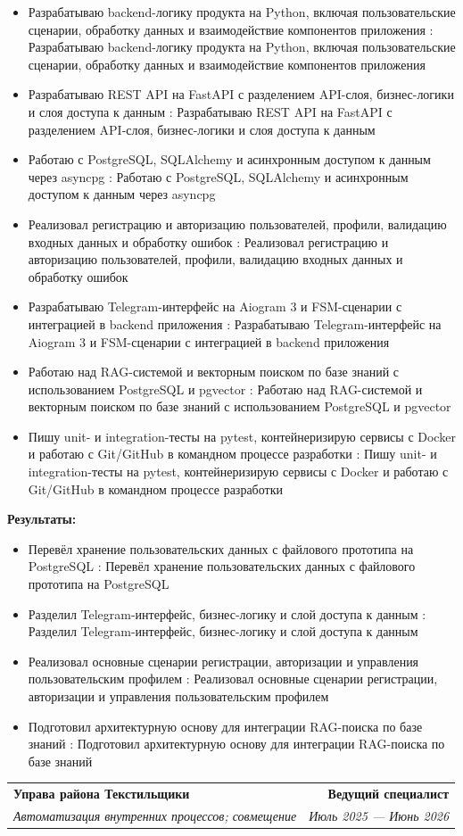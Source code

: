 \documentclass[a4paper,11pt]{article}
\makeatletter
\newcommand{\resumeItem}[2]{
  \item\small{
    \if\relax\detokenize{#1}\relax
      #2
    \else
      \textbf{#1}: #2
    \fi
    \vspace{-2pt}
  }
}
\newcommand{\resumeSubheading}[4]{
  \vspace{-1pt}\item
  \begin{tabular*}{0.97\textwidth}
    {l@{\extracolsep{\fill}}r}
    \textbf{#1} & #2 \\
    \textit{\small #3} & \textit{\small #4} \\
  \end{tabular*}
  \vspace{-5pt}
}
\newcommand{\resumeItemListStart}{
  \begin{itemize}[leftmargin=18pt]
}
\newcommand{\resumeItemListEnd}{
  \end{itemize}\vspace{-5pt}
}
\makeatother
\begin{document}
\vspace{3pt}

\resumeItemListStart

\resumeItem{}
{Разрабатываю backend-логику продукта на Python,
включая пользовательские сценарии, обработку данных
и взаимодействие компонентов приложения}

\resumeItem{}
{Разрабатываю REST API на FastAPI с разделением
API-слоя, бизнес-логики и слоя доступа к данным}

\resumeItem{}
{Работаю с PostgreSQL, SQLAlchemy и асинхронным
доступом к данным через asyncpg}

\resumeItem{}
{Реализовал регистрацию и авторизацию пользователей,
профили, валидацию входных данных и обработку ошибок}

\resumeItem{}
{Разрабатываю Telegram-интерфейс на Aiogram 3
и FSM-сценарии с интеграцией в backend приложения}

\resumeItem{}
{Работаю над RAG-системой и векторным поиском
по базе знаний с использованием PostgreSQL и pgvector}

\resumeItem{}
{Пишу unit- и integration-тесты на pytest,
контейнеризирую сервисы с Docker и работаю
с Git/GitHub в командном процессе разработки}

\resumeItemListEnd

\vspace{3pt}

\textbf{Результаты:}

\resumeItemListStart

\resumeItem{}
{Перевёл хранение пользовательских данных
с файлового прототипа на PostgreSQL}

\resumeItem{}
{Разделил Telegram-интерфейс, бизнес-логику
и слой доступа к данным}

\resumeItem{}
{Реализовал основные сценарии регистрации,
авторизации и управления пользовательским профилем}

\resumeItem{}
{Подготовил архитектурную основу для интеграции
RAG-поиска по базе знаний}

\resumeItemListEnd


\vspace{6pt}

\resumeSubheading
  {\Large Управа района Текстильщики}
  {\textbf{Ведущий специалист}}
  {Автоматизация внутренних процессов; совмещение}
  {Июль 2025 --- Июнь 2026}

\vspace{4pt}
\end{document}
